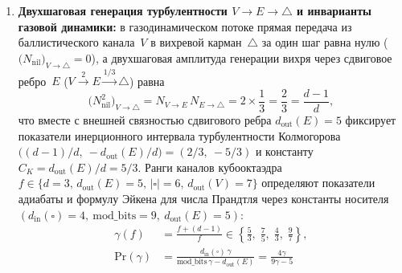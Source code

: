 \begin{theorem}
\begin{enumerate}[leftmargin=*]
  \begin{equation}
  \label{eq:compute-shell-channel-partition-sum}
  \begin{aligned}
    \mathbf{n}_k &= \mathbf{n}_1\,M_{\mathrm{chan}}^{\,k-1} = \bigl(12,\; 24m,\; 6m^2,\; 4m(m-1)\bigr),\\
    N_{\mathrm{shell}}(k) &= 12 + 24m + 6m^2 + 4m(m-1) = 10(m+1)^2 + 2 = 10k^2 + 2,
  \end{aligned}
  \end{equation}
  а прибор с четырьмя раздельными шинами считывания $(V,E,\square,\triangle)$, стробируемыми по каузальным окнам удержания $n_{\mathrm{ticks}}^{\max} = \lceil\frac{12}{d_{\mathrm{out}}}\frac{256}{41}\rceil = (11,15,19,25)$ тактов, восстанавливает вектор источника $\mathbf{n}_1 = \mathbf{n}_k\,M_{\mathrm{chan}}^{-(k-1)}$ алгебраически точно на любом расстоянии~$k$.
\item \textbf{Двухшаговая генерация турбулентности $V\to E\to\triangle$ и инварианты газовой динамики:}
  в газодинамическом потоке прямая передача из баллистического канала~$V$ в вихревой карман~$\triangle$ за один шаг равна нулю ($\bigl(N_{\mathrm{nil}}\bigr)_{V\to\triangle} = 0$), а двухшаговая амплитуда генерации вихря через сдвиговое ребро~$E$ ($V\xrightarrow{2} E\xrightarrow{1/3}\triangle$) равна
  \begin{equation}
  \label{eq:compute-vortex-cascade-23}
    \bigl(N_{\mathrm{nil}}^2\bigr)_{V\to\triangle} = N_{V\to E}\,N_{E\to\triangle} = 2\times\frac{1}{3} = \frac{2}{3} = \frac{d-1}{d},
  \end{equation}
  что вместе с внешней связностью сдвигового ребра $d_{\mathrm{out}}(E) = 5$ фиксирует показатели инерционного интервала турбулентности Колмогорова $\bigl((d-1)/d,\ -d_{\mathrm{out}}(E)/d\bigr) = (2/3,\ -5/3)$ и константу $C_K = d_{\mathrm{out}}(E)/d = 5/3$.
  Ранги каналов кубооктаэдра $f \in \{d = 3,\, d_{\mathrm{out}}(E) = 5,\, |\square| = 6,\, d_{\mathrm{out}}(V) = 7\}$ определяют показатели адиабаты и формулу Эйкена для числа Прандтля через константы носителя $(d_{\mathrm{in}}(\square) = 4,\ \mathrm{mod\_bits} = 9,\ d_{\mathrm{out}}(E) = 5)$:
  \begin{equation}
  \label{eq:compute-gas-gamma-prandtl}
  \begin{aligned}
    \gamma(f) &= \frac{f + (d-1)}{f} \in \left\{\frac{5}{3},\; \frac{7}{5},\; \frac{4}{3},\; \frac{9}{7}\right\},\\
    \mathrm{Pr}(\gamma) &= \frac{d_{\mathrm{in}}(\square)\,\gamma}{\mathrm{mod\_bits}\,\gamma - d_{\mathrm{out}}(E)} = \frac{4\gamma}{9\gamma - 5}

\end{aligned}
\end{equation}
\end{enumerate}
\end{theorem}
